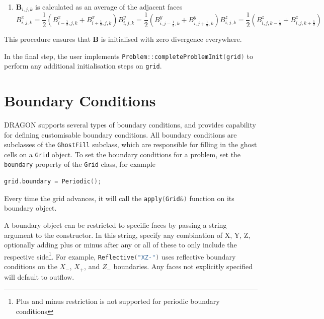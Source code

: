 \documentclass[11pt]{report}
\newcommand{\cpp}[1]{\lstinline[language=C++]{#1}}
\begin{document}
\begin{enumerate}
\begin{subequations}
\end{subequations}
\item $\mathbf{B}_{i,j,k}$ is calculated as an average of the adjacent faces
\begin{subequations}
\begin{equation} B^x_{i, j,k} = \frac12\left(B^x_{i-\frac12,j,k} + B^x_{i+\frac12,j,k}\right)\end{equation}
\begin{equation} B^y_{i, j,k} = \frac12\left(B^y_{i,j-\frac12,k} + B^y_{i,j+\frac12,k}\right)\end{equation}
\begin{equation} B^z_{i, j,k} = \frac12\left(B^z_{i,j,k-\frac12} + B^z_{i,j,k+\frac12}\right)\end{equation}
\end{subequations}
\end{enumerate}
This procedure ensures that $\mathbf{B}$ is initialised with zero divergence everywhere.

In the final step, the user implements \cpp{Problem::completeProblemInit(grid)} to perform any additional initialisation steps on \cpp{grid}.

\section{Boundary Conditions} \label{sec:boundary}
DRAGON supports several types of boundary conditions, and provides capability for defining customisable boundary conditions.
All boundary conditions are subclasses of the \cpp{GhostFill} subclass, which are responsible for filling in the ghost cells on a \cpp{Grid} object. 
To set the boundary conditions for a problem, set the \cpp{boundary} property of the \cpp{Grid} class, for example
\begin{lstlisting}[language=C++]
grid.boundary = Periodic();
\end{lstlisting}
Every time the grid advances, it will call the \cpp{apply(Grid&)} function on its boundary object.

A boundary object can be restricted to specific faces by passing a string argument to the constructor. In this string, specify any combination of X, Y, Z, optionally adding plus or minus after any or all of these to only include the respective side\footnote{Plus and minus restriction is not supported for periodic boundary conditions}. For example, \cpp{Reflective("XZ-")} uses reflective boundary conditions on the $X_-$, $X_+$, and $Z_-$ boundaries.  Any faces not explicitly specified will default to outflow. 
\end{document}
